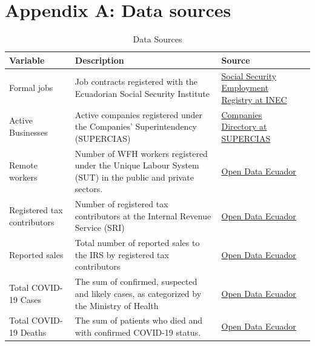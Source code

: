 \documentclass[11pt,a4paper]{article}\usepackage[]{graphicx}\usepackage[]{xcolor}
\begin{document}
\section*{Appendix A: Data sources}
\label{sec:appa}
\setcounter{table}{0} %
\renewcommand{\thetable}{A.\arabic{table}} %
\begin{table}[h]
\caption{Data Sources}
\vspace{0.1cm}
\label{tab:sources}
\begin{tabular}{lp{5cm}p{5cm}l@{}}
\toprule
\textbf{Variable}           & \textbf{Description}                                                                                        & \textbf{Source}                                       \\ \midrule
Formal jobs                 & Job contracts registered with the Ecuadorian Social Security Institute                                      & \href{https://www.ecuadorencifras.gob.ec/registro-empleo-seguridad-social/}{Social Security Employment Registry at INEC} \\
Active Businesses          & Active companies registered under the Companies' Superintendency   (SUPERCIAS)                              & \href{https://mercadodevalores.supercias.gob.ec/reportes/directorioCompanias.jsf}{Companies Directory at SUPERCIAS}                      \\
Remote workers              & Number of WFH workers registered under the Unique Labour System (SUT) in   the public and private sectors.  &\href{https://www.datosabiertos.gob.ec/}{Open Data Ecuador}                                     \\
Registered tax contributors & Number of registered tax contributors at the Internal Revenue Service   (SRI)                               & \href{https://www.datosabiertos.gob.ec/}{Open Data Ecuador}                                 \\
Reported sales              & Total number of reported sales to the IRS by registered tax contributors                                    & \href{https://www.datosabiertos.gob.ec/}{Open Data Ecuador}                                     \\
Total COVID-19   Cases & The sum of confirmed, suspected and likely   cases, as categorized by the Ministry of Health & \href{https://www.datosabiertos.gob.ec/}{Open Data Ecuador}    \\
Total COVID-19 Deaths  & The sum of patients who died and with confirmed COVID-19 status.                             & \href{https://www.datosabiertos.gob.ec/}{Open Data Ecuador}     \\

\end{tabular}
\end{table}
\end{document}
